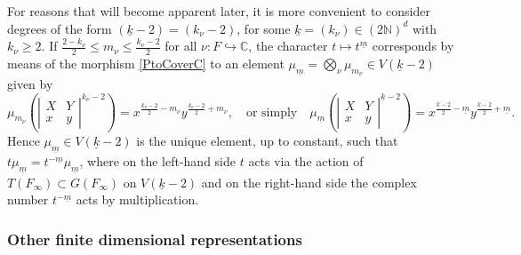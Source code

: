 \documentclass{amsart}
\theoremstyle{definition}
\theoremstyle{remark}
\numberwithin{equation}{section}
\newcommand{\C}{{\mathbb C}}
\newcommand{\N}{{\mathbb N}}
\begin{document}
For reasons that will become apparent later, it is more convenient to consider degrees of the form $(\underline k-2)=(k_{\nu}-2)$, for some $\underline k=(k_{\nu})\in (2\N)^d$ with $k_{\nu}\geq 2$.
If $\frac{2-k_{\nu}}{2}\leq m_{\nu}\leq\frac{k_{\nu}-2}{2}$ for all $\nu:F\hookrightarrow\C$, the character $t\mapsto t^{\underline m}$ corresponds by means of the morphism \eqref{PtoCoverC} to an element $\mu_{\underline m}=\bigotimes_{\nu}\mu_{m_{\nu}}\in V(\underline{k}-2)$ given by
\begin{equation}\label{defmumglobal}
    \mu_{m_{\nu}}\left(\left|\begin{array}{cc}X& Y\\  x&y \end{array}\right|^{k_{\nu}-2}\right)=x^{\frac{k_{\nu}-2}{2}-m_{\nu}}y^{\frac{k_{\nu}-2}{2}+m_{\nu}},\quad\mbox{or simply}\quad \mu_{\underline m}\left(\left|\begin{array}{cc}X& Y\\  x&y \end{array}\right|^{\underline k-2}\right)=x^{\frac{\underline k-2}{2}-\underline m}y^{\frac{\underline k-2}{2}+\underline m}.
\end{equation}
Hence $\mu_{\underline m}\in V(\underline{k}-2)$ is the unique element, up to constant, such that $t \mu_{\underline m}=t^{-\underline m}\mu_{\underline m}$, where on the left-hand side $t$ acts via the  action of $T(F_\infty)\subset G(F_\infty)$ on $V(\underline{k}-2)$ and on the right-hand side the complex number $t^{-\underline m}$ acts by multiplication. 

\subsubsection{Other finite dimensional representations}\label{otherfdreps}
\end{document}
